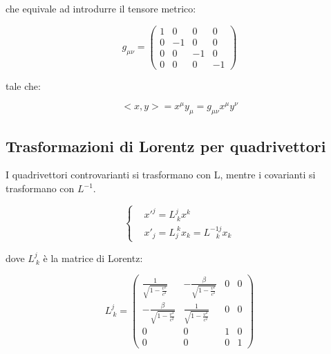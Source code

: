 \documentclass{article}
\begin{document}
che equivale ad introdurre il tensore metrico:

\begin{equation}
    g_{\mu\nu} =
    \begin{pmatrix}
        1 & 0  & 0  & 0  \\
        0 & -1 & 0  & 0  \\
        0 & 0  & -1 & 0  \\
        0 & 0  & 0  & -1
    \end{pmatrix}
\end{equation}

tale che:

\begin{equation}
    <x,y> = x^\mu y_\mu = g_{\mu\nu}x^\mu y^\nu
\end{equation}

\subsection{Trasformazioni di Lorentz per quadrivettori}

I quadrivettori controvarianti si trasformano con L, mentre i covarianti si trasformano con $L^{-1}$.

\begin{equation}
    \left\{
    \begin{aligned}
         & x'^j = L^j_{\ k}x^k                              \\
         & x'_j  = L_j^{\ k}x_k= L^{-1 j}_{\ \  \  \ k} x_k
    \end{aligned}
    \right.
\end{equation}

dove $L^j_{\ k}$ è la matrice di Lorentz:

\begin{equation}
    L^j_{\ k} =
    \begin{pmatrix}
        \frac{1}{\sqrt{1-\frac{v^2}{c^2}}}      & -\frac{\beta}{\sqrt{1-\frac{v^2}{c^2}}} & 0 & 0 \\
        -\frac{\beta}{\sqrt{1-\frac{v^2}{c^2}}} & \frac{1}{\sqrt{1-\frac{v^2}{c^2}}}      & 0 & 0 \\
        0                                       & 0                                       & 1 & 0 \\
        0                                       & 0                                       & 0 & 1
    \end{pmatrix}
\end{equation}
\end{document}

